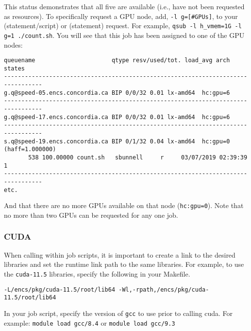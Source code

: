 This status demonstrates that all five are available (i.e., have not been 
requested as resources). To specifically request a GPU node, add,
\texttt{-l g=[\#GPUs]}, to your  (statement/script) or
 (statement) request. For example,
\texttt{qsub -l h\_vmem=1G -l g=1 ./count.sh}. You 
will see that this job has been assigned to one of the GPU nodes:

\small
\begin{verbatim}
queuename                      qtype resv/used/tot. load_avg arch          states
--------------------------------------------------------------------------------- 
g.q@speed-05.encs.concordia.ca BIP 0/0/32 0.01 lx-amd64  hc:gpu=6 
--------------------------------------------------------------------------------- 
g.q@speed-17.encs.concordia.ca BIP 0/0/32 0.01 lx-amd64  hc:gpu=6 
--------------------------------------------------------------------------------- 
s.q@speed-19.encs.concordia.ca BIP 0/1/32 0.04 lx-amd64  hc:gpu=0 (haff=1.000000) 
       538 100.00000 count.sh   sbunnell     r     03/07/2019 02:39:39     1
---------------------------------------------------------------------------------
etc. 
\end{verbatim}
\normalsize

And that there are no more GPUs available on that node (\texttt{hc:gpu=0}). Note
that no more than two GPUs can be requested for any one job. 

\subsubsection{CUDA}

When calling  within job scripts, it is important to create a link to
the desired  libraries and set the runtime link path to the same libraries. 
For example, to use the \texttt{cuda-11.5} libraries, specify the following in 
your Makefile.

\begin{verbatim}
-L/encs/pkg/cuda-11.5/root/lib64 -Wl,-rpath,/encs/pkg/cuda-11.5/root/lib64
\end{verbatim}

In your job script, specify the version of \texttt{gcc} to use prior to calling 
cuda. For example: 
   \texttt{module load gcc/8.4}
or
   \texttt{module load gcc/9.3}

